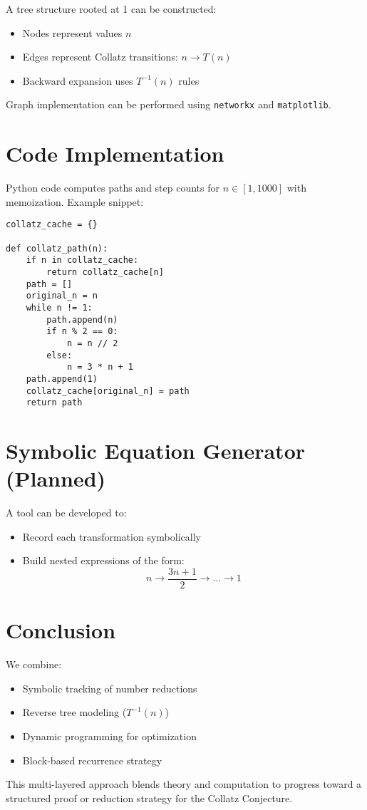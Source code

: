 \documentclass{article}
\begin{document}
A tree structure rooted at 1 can be constructed:
\begin{itemize}
    \item Nodes represent values \( n \)
    \item Edges represent Collatz transitions: \( n \rightarrow T(n) \)
    \item Backward expansion uses \( T^{-1}(n) \) rules
\end{itemize}

Graph implementation can be performed using \texttt{networkx} and \texttt{matplotlib}.

\section{Code Implementation}

Python code computes paths and step counts for \( n \in [1, 1000] \) with memoization. Example snippet:
\begin{verbatim}
collatz_cache = {}

def collatz_path(n):
    if n in collatz_cache:
        return collatz_cache[n]
    path = []
    original_n = n
    while n != 1:
        path.append(n)
        if n % 2 == 0:
            n = n // 2
        else:
            n = 3 * n + 1
    path.append(1)
    collatz_cache[original_n] = path
    return path
\end{verbatim}

\section{Symbolic Equation Generator (Planned)}

A tool can be developed to:
\begin{itemize}
    \item Record each transformation symbolically
    \item Build nested expressions of the form:
    \[
    n \rightarrow \frac{3n + 1}{2} \rightarrow \dots \rightarrow 1
    \]
\end{itemize}

\section{Conclusion}

We combine:
\begin{itemize}
    \item Symbolic tracking of number reductions
    \item Reverse tree modeling (\( T^{-1}(n) \))
    \item Dynamic programming for optimization
    \item Block-based recurrence strategy
\end{itemize}

This multi-layered approach blends theory and computation to progress toward a structured proof or reduction strategy for the Collatz Conjecture.
\end{document}
